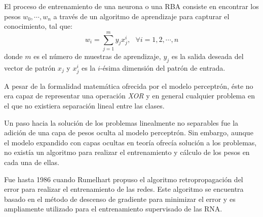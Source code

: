 \documentclass[journal]{IEEEtran}
\begin{document}
El proceso de entrenamiento de una neurona o una RBA consiste en encontrar los pesos $w_0, \cdots, w_n$ a través de un algoritmo de aprendizaje para capturar el conocimiento, tal que:
\begin{equation}
	w_i = \sum_{j=1}^m y_j x_j^i,~~~ \forall i = 1,2,\cdots,n
\end{equation}
donde $m$ es el número de muestras de aprendizaje, $y_j$ es la salida deseada del vector de patrón $x_j$ y $x_j^i$ es la $i$-ésima dimensión del patrón de entrada.

A pesar de la formalidad matemática ofrecida por el modelo perceptrón, éste no era capaz de representar una operación \emph{XOR} y en general cualquier problema en el que no existiera separación lineal entre las clases.

Un paso hacia la solución de los problemas linealmente no separables fue la adición de una capa de pesos oculta al modelo perceptrón.
Sin embargo, aunque el modelo expandido con capas ocultas en teoría ofrecía solución a los problemas, no existía un algoritmo para realizar el entrenamiento y cálculo de los pesos en cada una de ellas.

Fue hasta 1986 cuando Rumelhart propuso el algoritmo retropropagación del error para realizar el entrenamiento de las redes.
Este algoritmo se encuentra basado en el método de descenso de gradiente para minimizar el error y es ampliamente utilizado para el entrenamiento supervisado de las RNA.
\end{document}
